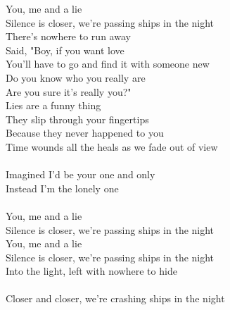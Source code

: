 You, me and a lie \\
Silence is closer, we're passing ships in the night \\
There's nowhere to run away \\
Said, "Boy, if you want love \\
You'll have to go and find it with someone new \\
Do you know who you really are \\
Are you sure it's really you?" \\
Lies are a funny thing \\
They slip through your fingertips \\
Because they never happened to you \\
Time wounds all the heals as we fade out of view \\
~\\
Imagined I'd be your one and only \\
Instead I'm the lonely one \\
~\\
You, me and a lie \\
Silence is closer, we're passing ships in the night \\
You, me and a lie \\
Silence is closer, we're passing ships in the night \\
Into the light, left with nowhere to hide \\
~\\
Closer and closer, we're crashing ships in the night 
 
